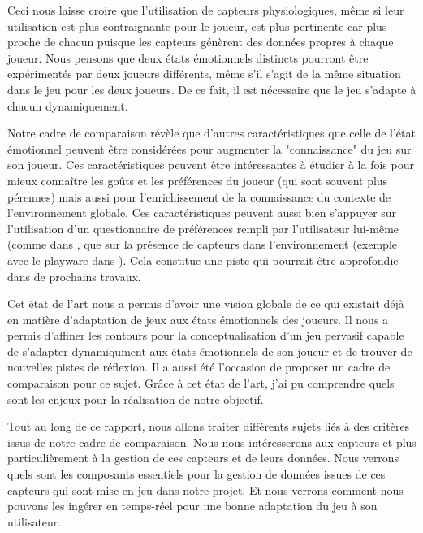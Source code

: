 \documentclass[11pt]{article}
\begin{document}
		Ceci nous laisse croire que l'utilisation de capteurs physiologiques, même si leur utilisation est plus contraignante pour le joueur, est plus pertinente car plus proche de chacun puisque les capteurs génèrent des données propres à chaque joueur.
		Nous pensons que deux états émotionnels distincts pourront être expérimentés par deux joueurs différents, même s'il s'agit de la même situation dans le jeu pour les deux joueurs.
		De ce fait, il est nécessaire que le jeu s'adapte à chacun dynamiquement.\par
		Notre cadre de comparaison révèle que d'autres caractéristiques que celle de l'état émotionnel peuvent être considérées pour augmenter la "connaissance" du jeu sur son joueur.
		Ces caractéristiques peuvent être intéressantes à étudier à la fois pour mieux connaître les goûts et les préférences du joueur (qui sont souvent plus pérennes) mais aussi pour l'enrichissement de la connaissance du contexte de l'environnement globale.
		Ces caractéristiques peuvent aussi bien s'appuyer sur l'utilisation d'un questionnaire de préférences rempli par l'utilisateur lui-même (comme dans \cite{carofiglio_et_al._2019, maier_et_al._2019}, que sur la présence de capteurs dans l'environnement (exemple avec le playware dans \cite{yannakakis_et_al._2009}).
		Cela constitue une piste qui pourrait être approfondie dans de prochains travaux.\par
		Cet état de l'art nous a permis d'avoir une vision globale de ce qui existait déjà en matière d'adaptation de jeux aux états émotionnels des joueurs. 
		Il nous a permis d'affiner les contours pour la conceptualisation d'un jeu pervasif capable de s'adapter dynamiqument aux états émotionnels de son joueur et de trouver de nouvelles pistes de réflexion. 
		Il a aussi été l'occasion de proposer un cadre de comparaison pour ce sujet.
		Grâce à cet état de l'art, j'ai pu comprendre quels sont les enjeux pour la réalisation de notre objectif.\par
		Tout au long de ce rapport, nous allons traiter différents sujets liés à des critères issus de notre cadre de comparaison.
		Nous nous intéresserons aux capteurs et plus particulièrement à la gestion de ces capteurs et de leurs données.
		Nous verrons quels sont les composants essentiels pour la gestion de données issues de ces capteurs qui sont mise en jeu dans notre projet.
		Et nous verrons comment nous pouvons les ingérer en temps-réel pour une bonne adaptation du jeu à son utilisateur.
\end{document}
